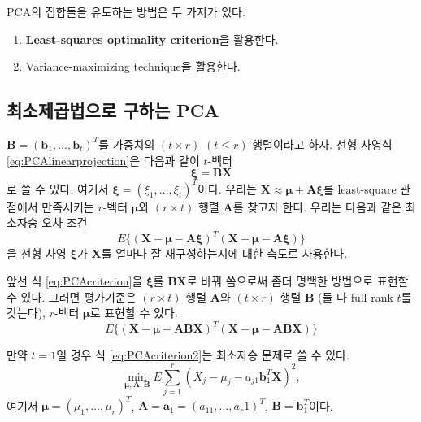 \documentclass[b5paper,]{scrbook}
\theoremstyle{plain}
\theoremstyle{definition}
\numberwithin{equation}{section}
\begin{document}
PCA의 집합들을 유도하는 방법은 두 가지가 있다.

\begin{enumerate}
\def\labelenumi{\arabic{enumi}.}
\item
  \textbf{Least-squares optimality criterion}을 활용한다.
\item
  Variance-maximizing technique을 활용한다.
\end{enumerate}

\hypertarget{--pca}{%
\subsection{최소제곱법으로 구하는 PCA}\label{--pca}}

\(\mathbf{B}=(\mathbf{b}_{1},\ldots, \mathbf{b}_{t})^{T}\)를 가중치의 \((t\times r)\) \((t\leq r)\) 행렬이라고 하자. 선형 사영식 \eqref{eq:PCAlinearprojection}은 다음과 같이 \(t\)-벡터
\[\boldsymbol{\xi}=\mathbf{BX}\]
로 쓸 수 있다. 여기서 \(\boldsymbol{\xi}=(\xi_{1},\ldots , \xi_{t})^{T}\)이다. 우리는 \(\mathbf{X}\approx\boldsymbol{\mu}+\mathbf{A}\boldsymbol{\xi}\)를 least-square 관점에서 만족시키는 \(r\)-벡터 \(\boldsymbol{\mu}\)와 \((r\times t)\) 행렬 \(\mathbf{A}\)를 찾고자 한다. 우리는 다음과 같은 최소자승 오차 조건
\begin{equation}
E\{ (\mathbf{X}-\boldsymbol{\mu}-\mathbf{A}\boldsymbol{\xi})^{T}(\mathbf{X}-\boldsymbol{\mu}-\mathbf{A}\boldsymbol{\xi}) \}
\label{eq:PCAcriterion}
\end{equation}
을 선형 사영 \(\boldsymbol{\xi}\)가 \(\mathbf{X}\)를 얼마나 잘 재구성하는지에 대한 측도로 사용한다.

앞선 식 \eqref{eq:PCAcriterion}을 \(\boldsymbol{\xi}\)를 \(\mathbf{BX}\)로 바꿔 씀으로써 좀더 명백한 방법으로 표현할 수 있다. 그러면 평가기준은 \((r\times t)\) 행렬 \(\mathbf{A}\)와 \((t\times r)\) 행렬 \(\mathbf{B}\) (둘 다 full rank \(t\)를 갖는다), \(r\)-벡터 \(\boldsymbol{\mu}\)로 표현할 수 있다.
\begin{equation}
E\{ (\mathbf{X}-\boldsymbol{\mu}-\mathbf{ABX})^{T}(\mathbf{X}-\boldsymbol{\mu}-\mathbf{ABX}) \}
\label{eq:PCAcriterion2}
\end{equation}

만약 \(t=1\)일 경우 식 \eqref{eq:PCAcriterion2}는 최소자승 문제로 쓸 수 있다.
\[\min_{\boldsymbol{\mu},\mathbf{A},\mathbf{B}}E\sum_{j=1}^{r}(X_{j}-\mu_{j}-a_{j1}\mathbf{b}_{1}^{T}\mathbf{X})^{2},\]
여기서 \(\boldsymbol{\mu}=(\mu_{1},\ldots, \mu_{r})^{T}\), \(\mathbf{A}=\mathbf{a}_{1}=(a_{11},\ldots, a_{r}1)^{T}\), \(\mathbf{B}=\mathbf{b}_{1}^{T}\)이다.
\end{document}
